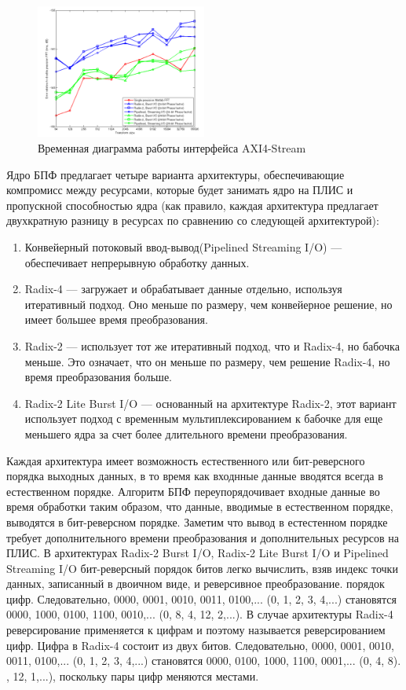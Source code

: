 \begin{figure}[h]
	\centering
	\includegraphics[width=0.5\textwidth]{image/fft_xilinx_fp.png}
	\caption{Временная диаграмма работы интерфейса AXI4-Stream}
	\label{fft_detailed_implem}
\end{figure}

Ядро БПФ предлагает четыре варианта архитектуры, обеспечивающие компромисс между ресурсами, которые будет занимать ядро на ПЛИС и пропускной способностью ядра (как правило, каждая архитектура предлагает двухкратную разницу в ресурсах по сравнению со следующей архитектурой): 
\begin{enumerate}
	\item Конвейерный потоковый ввод-вывод(Pipelined Streaming I/O) — обеспечивает непрерывную обработку данных. 
	\item Radix-4 — загружает и обрабатывает данные отдельно, используя итеративный подход. Оно меньше по размеру, чем конвейерное решение, но имеет большее время преобразования. 
	\item Radix-2 — использует тот же итеративный подход, что и Radix-4, но бабочка меньше. Это означает, что он меньше по размеру, чем решение Radix-4, но время преобразования больше. 
	\item Radix-2 Lite Burst I/O — основанный на архитектуре Radix-2, этот вариант использует подход с временным мультиплексированием к бабочке для еще меньшего ядра за счет более длительного времени преобразования.
\end{enumerate} 

Каждая архитектура имеет возможность естественного или бит-реверсного порядка выходных данных, в то время как входнные данные вводятся всегда в естественном порядке. Алгоритм БПФ переупорядочивает входные данные во время обработки таким образом, что данные, вводимые в естественном порядке, выводятся в бит-реверсном порядке. Заметим что вывод в естестенном порядке требует дополнительного времени преобразования и дополнительных ресурсов на ПЛИС. В архитектурах Radix-2 Burst I/O, Radix-2 Lite Burst I/O и Pipelined Streaming I/O бит-реверсный порядок битов легко вычислить, взяв индекс точки данных, записанный в двоичном виде, и реверсивное преобразование. порядок цифр. Следовательно, 0000, 0001, 0010, 0011, 0100,... (0, 1, 2, 3, 4,...) становятся 0000, 1000, 0100, 1100, 0010,... (0, 8, 4, 12, 2,...). В случае архитектуры Radix-4 реверсирование применяется к цифрам и поэтому называется реверсированием цифр. Цифра в Radix-4 состоит из двух битов. Следовательно, 0000, 0001, 0010, 0011, 0100,... (0, 1, 2, 3, 4,...) становятся 0000, 0100, 1000, 1100, 0001,... (0, 4, 8). , 12, 1,...), поскольку пары цифр меняются местами. 

